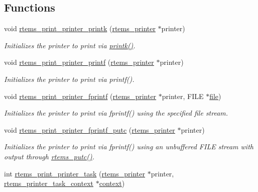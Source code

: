 \subsection*{Functions}
\begin{DoxyCompactItemize}
\item 
void \mbox{\hyperlink{group__RTEMSPrintSupport_ga553b725c5361554dc9788e1a6a82b373}{rtems\+\_\+print\+\_\+printer\+\_\+printk}} (\mbox{\hyperlink{structrtems__printer}{rtems\+\_\+printer}} $\ast$printer)
\begin{DoxyCompactList}\small\item\em Initializes the printer to print via \mbox{\hyperlink{bspIo_8h_a380cfecc8035cec8a13b68c0cb90f32f}{printk()}}. \end{DoxyCompactList}\item 
void \mbox{\hyperlink{group__RTEMSPrintSupport_ga90a67702ffe1d15690e1de2b15bf229f}{rtems\+\_\+print\+\_\+printer\+\_\+printf}} (\mbox{\hyperlink{structrtems__printer}{rtems\+\_\+printer}} $\ast$printer)
\begin{DoxyCompactList}\small\item\em Initializes the printer to print via printf(). \end{DoxyCompactList}\item 
void \mbox{\hyperlink{group__RTEMSPrintSupport_ga1495ba5b6aea0cd31f5b98f5c28d3beb}{rtems\+\_\+print\+\_\+printer\+\_\+fprintf}} (\mbox{\hyperlink{structrtems__printer}{rtems\+\_\+printer}} $\ast$printer, F\+I\+LE $\ast$\mbox{\hyperlink{structfile}{file}})
\begin{DoxyCompactList}\small\item\em Initializes the printer to print via fprintf() using the specified file stream. \end{DoxyCompactList}\item 
void \mbox{\hyperlink{group__RTEMSPrintSupport_ga527e5e5b91e40e2fc44a13be10484105}{rtems\+\_\+print\+\_\+printer\+\_\+fprintf\+\_\+putc}} (\mbox{\hyperlink{structrtems__printer}{rtems\+\_\+printer}} $\ast$printer)
\begin{DoxyCompactList}\small\item\em Initializes the printer to print via fprintf() using an unbuffered F\+I\+LE stream with output through \mbox{\hyperlink{bspIo_8h_a6fd11f34260f10035f38a051af872e1e}{rtems\+\_\+putc()}}. \end{DoxyCompactList}\item 
int \mbox{\hyperlink{group__RTEMSPrintSupport_ga826644e95a7ef01b186d55cf7bf37766}{rtems\+\_\+print\+\_\+printer\+\_\+task}} (\mbox{\hyperlink{structrtems__printer}{rtems\+\_\+printer}} $\ast$printer, \mbox{\hyperlink{structrtems__printer__task__context}{rtems\+\_\+printer\+\_\+task\+\_\+context}} $\ast$\mbox{\hyperlink{sun4u_2tte_8h_a9b4a99475e2709333b8e5d70483173f1}{context}})

\end{DoxyCompactItemize}
